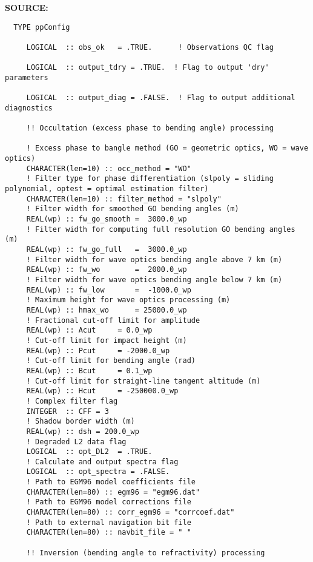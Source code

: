 \textbf{SOURCE:}\hspace{0.08in}\begin{Verbatim}
  TYPE ppConfig

     LOGICAL  :: obs_ok   = .TRUE.      ! Observations QC flag
     
     LOGICAL  :: output_tdry = .TRUE.  ! Flag to output 'dry' parameters

     LOGICAL  :: output_diag = .FALSE.  ! Flag to output additional diagnostics

     !! Occultation (excess phase to bending angle) processing

     ! Excess phase to bangle method (GO = geometric optics, WO = wave optics)
     CHARACTER(len=10) :: occ_method = "WO"
     ! Filter type for phase differentiation (slpoly = sliding polynomial, optest = optimal estimation filter)
     CHARACTER(len=10) :: filter_method = "slpoly"
     ! Filter width for smoothed GO bending angles (m)
     REAL(wp) :: fw_go_smooth =  3000.0_wp  
     ! Filter width for computing full resolution GO bending angles (m)
     REAL(wp) :: fw_go_full   =  3000.0_wp  
     ! Filter width for wave optics bending angle above 7 km (m)
     REAL(wp) :: fw_wo        =  2000.0_wp 
     ! Filter width for wave optics bending angle below 7 km (m)
     REAL(wp) :: fw_low       =  -1000.0_wp 
     ! Maximum height for wave optics processing (m)
     REAL(wp) :: hmax_wo      = 25000.0_wp
     ! Fractional cut-off limit for amplitude
     REAL(wp) :: Acut     = 0.0_wp      
     ! Cut-off limit for impact height (m)
     REAL(wp) :: Pcut     = -2000.0_wp      
     ! Cut-off limit for bending angle (rad)
     REAL(wp) :: Bcut     = 0.1_wp 
     ! Cut-off limit for straight-line tangent altitude (m)
     REAL(wp) :: Hcut     = -250000.0_wp 
     ! Complex filter flag
     INTEGER  :: CFF = 3
     ! Shadow border width (m)
     REAL(wp) :: dsh = 200.0_wp
     ! Degraded L2 data flag
     LOGICAL  :: opt_DL2  = .TRUE.      
     ! Calculate and output spectra flag
     LOGICAL  :: opt_spectra = .FALSE.
     ! Path to EGM96 model coefficients file
     CHARACTER(len=80) :: egm96 = "egm96.dat"
     ! Path to EGM96 model corrections file
     CHARACTER(len=80) :: corr_egm96 = "corrcoef.dat"
     ! Path to external navigation bit file
     CHARACTER(len=80) :: navbit_file = " "

     !! Inversion (bending angle to refractivity) processing


\end{Verbatim}
